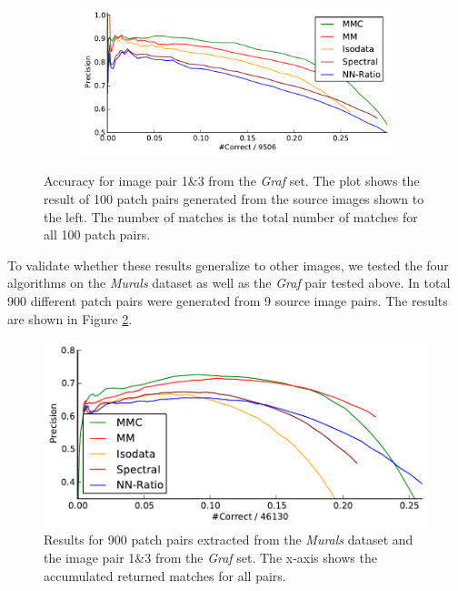 \begin{figure}[htb]
\begin{subfigure}[c]{0.2\textwidth}
	\end{subfigure}%
	~ %
	\begin{subfigure}[c]{0.8\textwidth}
	\centering
	\includegraphics[width=\columnwidth]{images/result_graf}
	\end{subfigure}%
	\caption{Accuracy for image pair 1\&3 from the \emph{Graf} set. The 
	plot shows the result of 100 patch pairs generated from the source 
images shown to the left. The number of matches is the total number of 
matches for all 100 patch pairs.}
	\label{fig:result_graf}
\end{figure}

To validate whether these results generalize to other images, we tested 
the four algorithms on the \emph{Murals} dataset as well as the 
\emph{Graf} pair tested above.  In total 900 different patch pairs were 
generated from 9 source image pairs.  The results are shown in Figure 
\ref{fig:result_accumulated}. 

\begin{figure}[htb]
	\centering
	\includegraphics[width=\columnwidth]{images/result_accumulated}
	\caption{Results for 900 patch pairs extracted from the 
	\emph{Murals} dataset and the image pair 1\&3 from the \emph{Graf} 
	set.  The x-axis shows the accumulated returned matches for all 
pairs.}
	\label{fig:result_accumulated}
\end{figure}

